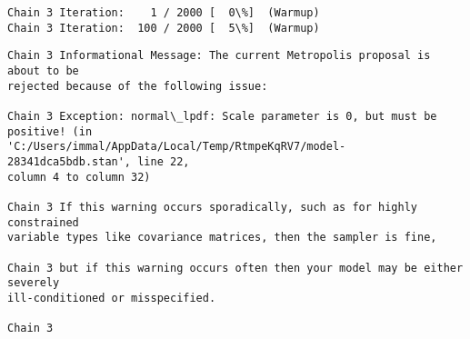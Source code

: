 \documentclass[11pt]{article}
\begin{document}
    \begin{Verbatim}[commandchars=\\\{\}]
Chain 3 Iteration:    1 / 2000 [  0\%]  (Warmup)
Chain 3 Iteration:  100 / 2000 [  5\%]  (Warmup)
    \end{Verbatim}

    \begin{Verbatim}[commandchars=\\\{\}]
Chain 3 Informational Message: The current Metropolis proposal is about to be
rejected because of the following issue:

Chain 3 Exception: normal\_lpdf: Scale parameter is 0, but must be positive! (in
'C:/Users/immal/AppData/Local/Temp/RtmpeKqRV7/model-28341dca5bdb.stan', line 22,
column 4 to column 32)

Chain 3 If this warning occurs sporadically, such as for highly constrained
variable types like covariance matrices, then the sampler is fine,

Chain 3 but if this warning occurs often then your model may be either severely
ill-conditioned or misspecified.

Chain 3

    \end{Verbatim}
\end{document}
